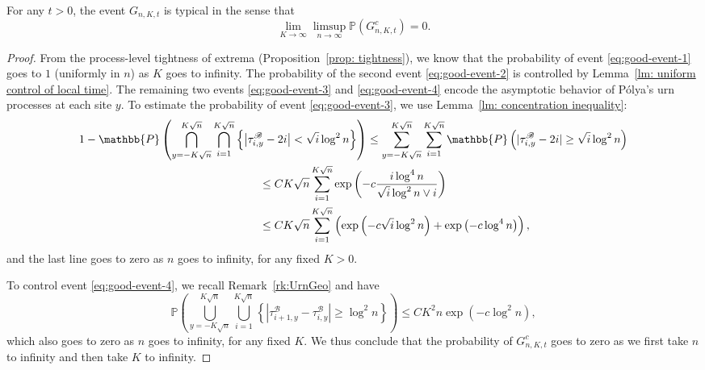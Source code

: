 \documentclass[EJP]{ejpecp} %
\begin{document}
\begin{lemma}
	\label{lm:good-event}
	For any $t > 0$, the event $G_{n,K,t}$ is typical in the sense that
	\[
	\lim_{K \to \infty } \limsup_{n \to \infty } 
	\mathbb{P}(G^c_{n, K,t}) = 0
	.\] 
\end{lemma}
\begin{proof}%
	From the process-level tightness of extrema (Proposition~\ref{prop: tightness}), we know that the probability of event \eqref{eq:good-event-1} goes to $1$ (uniformly in $n$) as $K $ goes to infinity. The probability of the second event \eqref{eq:good-event-2} is controlled by Lemma~\ref{lm: uniform control of local time}. 
	The remaining two events \eqref{eq:good-event-3} and \eqref{eq:good-event-4} encode the asymptotic behavior of P\'{o}lya's urn processes at each site $y$. To estimate the probability of event \eqref{eq:good-event-3}, we use Lemma~\ref{lm: concentration inequality}:
	\begin{align*}
		&1-\mathbb{P}\left(\bigcap_{y = -K \sqrt{n}}^{K \sqrt{n} }\bigcap_{i = 1}^{K \sqrt{n} } \left\{\left| \tau_{i,y}^{\mathscr{B}} - 2 i \right| < \sqrt{ i } \log^2 n \right\}
		\right)
		\le \sum_{y = - K \sqrt{n} }^{K \sqrt{n}}\sum_{i = 1}^{K \sqrt{n}} \mathbb{P}\left( |\tau_{i,y}^{\mathscr{B}} - 2i| \ge \sqrt{i} \log^2 n \right) \\
		&\hspace*{16em} \le CK \sqrt{n} \sum_{i = 1}^{K \sqrt{n}} \exp\left( - c \frac{i \log^4 n}{\sqrt{i}  \log^2 n \vee i} \right)  \\
		&\hspace*{16em} \le CK \sqrt{n}  \sum_{i = 1}^{K \sqrt{n}}
		\left( \exp\left( - c \sqrt{i}  \log^2 n \right)  +
		\exp\left( - c \log^4 n \right) \right),
	\end{align*}
	and the last line goes to zero as $n$ goes to infinity, for any fixed $K>0$. 

	To control event \eqref{eq:good-event-4}, we recall Remark~\ref{rk:UrnGeo} and have
	\[
	\mathbb{P}\left(\bigcup_{y = -K \sqrt{n}}^{K \sqrt{n} }\bigcup_{i = 1}^{K \sqrt{n}}\left\{\left| \tau_{i+1,y}^{\mathscr{B}} - \tau_{i,y}^{\mathscr{B}} \right| \ge  \log^2 n \right\}\right) 
	\le C K^2 n \exp\left( - c \log^2 n \right) 
	,\] 
	which also goes to zero as $n$ goes to infinity, for any fixed $K$. We thus conclude that the probability of $G^c_{n, K, t}$ goes to zero as we first take $n$ to infinity and then take $K$ to infinity.
\end{proof}
\end{document}
